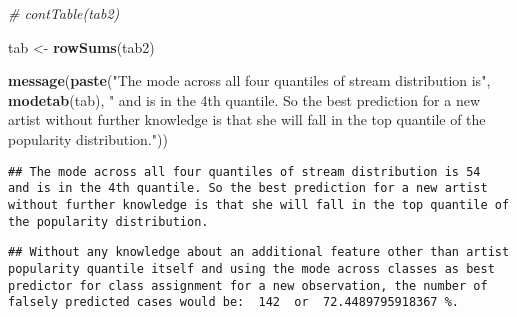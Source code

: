 \documentclass[
]{article}
\newenvironment{Shaded}{\begin{snugshade}}{\end{snugshade}}
\newcommand{\CommentTok}[1]{\textcolor[rgb]{0.56,0.35,0.01}{\textit{#1}}}
\newcommand{\DecValTok}[1]{\textcolor[rgb]{0.00,0.00,0.81}{#1}}
\newcommand{\KeywordTok}[1]{\textcolor[rgb]{0.13,0.29,0.53}{\textbf{#1}}}
\newcommand{\NormalTok}[1]{#1}
\newcommand{\OperatorTok}[1]{\textcolor[rgb]{0.81,0.36,0.00}{\textbf{#1}}}
\newcommand{\StringTok}[1]{\textcolor[rgb]{0.31,0.60,0.02}{#1}}
\begin{document}
\begin{Shaded}
\begin{Highlighting}[]
\CommentTok{# contTable(tab2)}


\NormalTok{tab <-}\StringTok{ }\KeywordTok{rowSums}\NormalTok{(tab2)}

\KeywordTok{message}\NormalTok{(}\KeywordTok{paste}\NormalTok{(}\StringTok{"The mode across all four quantiles of stream distribution is"}\NormalTok{, }\KeywordTok{modetab}\NormalTok{(tab), }\StringTok{" and is in the 4th quantile. So the best prediction for a new artist without further knowledge is that she will fall in the top quantile of the popularity distribution."}\NormalTok{))}
\end{Highlighting}
\end{Shaded}

\begin{verbatim}
## The mode across all four quantiles of stream distribution is 54  and is in the 4th quantile. So the best prediction for a new artist without further knowledge is that she will fall in the top quantile of the popularity distribution.
\end{verbatim}

\begin{Shaded}
\end{Shaded}

\begin{verbatim}
## Without any knowledge about an additional feature other than artist popularity quantile itself and using the mode across classes as best predictor for class assignment for a new observation, the number of falsely predicted cases would be:  142  or  72.4489795918367 %.
\end{verbatim}
\end{document}
